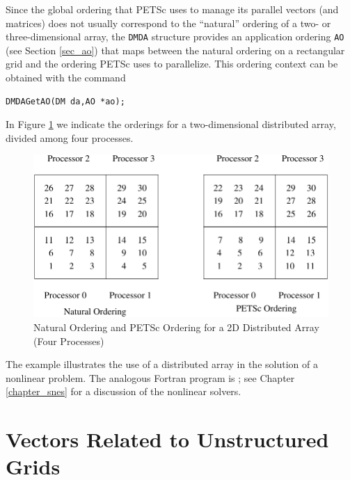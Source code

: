 Since the global ordering that PETSc uses to manage its parallel vectors
(and matrices) does not usually correspond to the ``natural'' ordering
of a two- or three-dimensional array, the \lstinline{DMDA} structure provides
an application ordering \lstinline{AO} (see Section \ref{sec_ao}) that maps
between the natural ordering on a rectangular grid and the ordering PETSc
uses to parallelize. This ordering context can be obtained with the command
\begin{lstlisting}
DMDAGetAO(DM da,AO *ao);
\end{lstlisting}
In Figure \ref{fig_daao} we indicate the orderings for a two-dimensional distributed
array, divided among four processes.

\begin{figure}[tb]
\centerline{ \includegraphics{danumbering}}
\caption{Natural Ordering and PETSc Ordering for a 2D Distributed Array (Four Processes)}
\label{fig_daao}
\end{figure}

The example
\href{http://www.mcs.anl.gov/petsc/petsc-current/src/snes/examples/tutorials/ex5.c.html}{}
illustrates the use of a distributed array in the solution of
a nonlinear problem.  The analogous Fortran program is
\href{http://www.mcs.anl.gov/petsc/petsc-current/src/snes/examples/tutorials/ex5f.F90.html}{};
see Chapter \ref{chapter_snes} for a discussion of the nonlinear
solvers.

\section{Vectors Related to Unstructured Grids}
\label{sec_unstruct}

